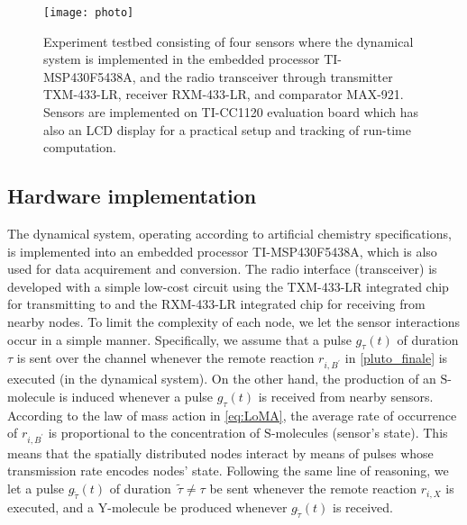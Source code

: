 \documentclass[journal]{IEEEtran}
\newcommand{\mol}[1]{\ensuremath{\textrm{#1}}}
\begin{document}
\begin{figure}[t]
\centering
\centerline{\texttt{[image: photo]}}
\caption{Experiment testbed consisting of four sensors where the dynamical system is implemented in the embedded processor TI-MSP430F5438A, and the radio transceiver through transmitter TXM-433-LR, receiver RXM-433-LR, and comparator MAX-921. Sensors are implemented on TI-CC1120 evaluation board which has also an LCD display for a practical setup and tracking of run-time computation.}
\label{fig:photo}
\end{figure}


\subsection{Hardware implementation}

The dynamical system, operating according to artificial chemistry specifications, is implemented into an embedded processor TI-MSP430F5438A, which is also used for data acquirement and conversion. The radio interface (transceiver) is developed with a simple low-cost circuit using the TXM-433-LR integrated chip for transmitting to and the RXM-433-LR integrated chip for receiving from nearby nodes. {To limit the complexity of each node, we let the sensor interactions occur in a simple manner. Specifically, we assume that a pulse $g_\tau(t)$ of duration $\tau$ is sent over the channel whenever the remote reaction $r_{i,{B^{\prime}}}$ in \eqref{pluto_finale} is executed (in the dynamical system). On the other hand, the production of an $\mol{S}$-molecule is induced whenever a pulse $g_\tau(t)$ is received from nearby sensors. According to the law of mass action in \eqref{eq:LoMA}, the average rate of occurrence of $r_{i,{B^{\prime}}}$ is proportional to the concentration of $\mol{S}$-molecules (sensor's state). This means that the spatially distributed nodes interact by means of  pulses whose transmission rate encodes nodes' state. Following the same line of reasoning, we let a pulse $g_{\tilde \tau}(t)$ of duration~$\tilde \tau \ne \tau$ be sent whenever the remote reaction $r_{i,X}$ is executed, and a $\mol{Y}$-molecule be produced whenever $g_{\tilde \tau}(t)$ is received.} 
\end{document}
